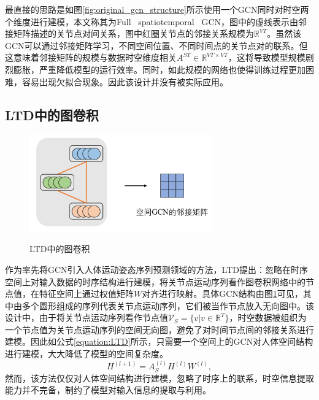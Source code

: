 最直接的思路是如图\ref{fig:original_gcn_structure}所示使用一个GCN同时对时空两个维度进行建模，本文称其为Full \ spatiotemporal \ GCN，图中的虚线表示由邻接矩阵描述的关节点对间关系，图中红圈关节点的邻接关系规模为$\mathbb{R}^{VT}$。虽然该GCN可以通过邻接矩阵学习，不同空间位置、不同时间点的关节点对的联系。但这意味着邻接矩阵的规模与数据时空维度相关${A}^{ST} \in \mathbb{R}^{VT\times VT}$，这将导致模型规模剧烈膨胀，严重降低模型的运行效率。同时，如此规模的网络也使得训练过程更加困难，容易出现欠拟合现象。因此该设计并没有被实际应用。

\subsection{LTD中的图卷积}
\begin{figure}[ht]
    \centering
    \includegraphics[width=0.7\textwidth]{FigMa/LTD_gcn.png}\\
    \vspace{-0.3cm}
    \caption{LTD中的图卷积}
    \label{fig:LTD_gcn_structure}
\end{figure}

作为率先将GCN引入人体运动姿态序列预测领域的方法，LTD提出：忽略在时序空间上对输入数据的时序结构进行建模，将关节点运动序列看作图卷积网络中的节点值，在特征空间上通过权值矩阵$W$对齐进行映射。具体GCN结构由图\ref{fig:LTD_gcn_structure}可见，其中由多个圆形组成的序列代表关节点运动序列，它们被当作节点放入无向图中。该设计中，由于将关节点运动序列看作节点值$\mathcal{V}_S = \{v | v \in \mathbb{R}^{T} \}$，时空数据被组织为一个节点值为关节点运动序列的空间无向图，避免了对时间节点间的邻接关系进行建模。因此如公式\ref{equation:LTD}所示，只需要一个空间上的GCN对人体空间结构进行建模，大大降低了模型的空间复杂度。
\begin{equation}
    {H}^{(l+1)}= {A}_{S}^{(l)}{H}^{(l)}{W}^{(l)},
    \label{equation:LTD}
\end{equation}
然而，该方法仅仅对人体空间结构进行建模，忽略了时序上的联系，时空信息提取能力并不完备，制约了模型对输入信息的提取与利用。

